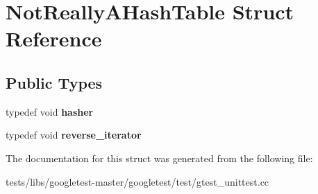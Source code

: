 \hypertarget{structNotReallyAHashTable}{}\section{Not\+Really\+A\+Hash\+Table Struct Reference}
\label{structNotReallyAHashTable}
\subsection*{Public Types}
\begin{DoxyCompactItemize}
\item 
\mbox{\label{structNotReallyAHashTable_a0206bef6150919c8ba5d539d5bf555f7}} 
typedef void {\bfseries hasher}
\item 
\mbox{\label{structNotReallyAHashTable_a8dbee2a2a80768191c736fb57367cfe7}} 
typedef void {\bfseries reverse\+\_\+iterator}
\end{DoxyCompactItemize}


The documentation for this struct was generated from the following file\+:\begin{DoxyCompactItemize}
\item 
tests/libs/googletest-\/master/googletest/test/gtest\+\_\+unittest.\+cc\end{DoxyCompactItemize}
